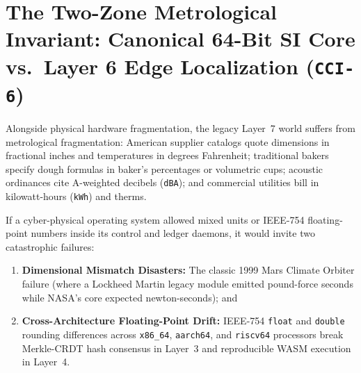\section{The Two-Zone Metrological Invariant: Canonical 64-Bit SI Core vs.\ Layer 6 Edge Localization (\texttt{CCI-6})}
\label{sec:l7-two-zone-metrology}

Alongside physical hardware fragmentation, the legacy Layer~7 world suffers from metrological fragmentation: American supplier catalogs quote dimensions in fractional inches and temperatures in degrees Fahrenheit; traditional bakers specify dough formulas in baker's percentages or volumetric cups; acoustic ordinances cite A-weighted decibels (\texttt{dBA}); and commercial utilities bill in kilowatt-hours (\texttt{kWh}) and therms.

If a cyber-physical operating system allowed mixed units or IEEE-754 floating-point numbers inside its control and ledger daemons, it would invite two catastrophic failures:
\begin{enumerate}
    \item \textbf{Dimensional Mismatch Disasters:} The classic 1999 Mars Climate Orbiter failure (where a Lockheed Martin legacy module emitted pound-force seconds while NASA's core expected newton-seconds); and
    \item \textbf{Cross-Architecture Floating-Point Drift:} IEEE-754 \texttt{float} and \texttt{double} rounding differences across \texttt{x86\_64}, \texttt{aarch64}, and \texttt{riscv64} processors break Merkle-CRDT hash consensus in Layer~3 and reproducible WASM execution in Layer~4.
\end{enumerate}

